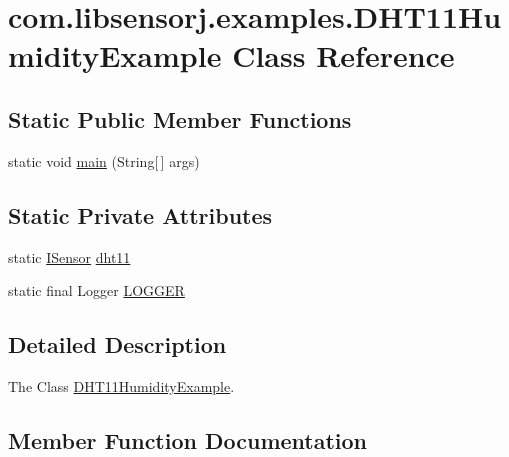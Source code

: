 \hypertarget{classcom_1_1libsensorj_1_1examples_1_1DHT11HumidityExample}{}\section{com.\+libsensorj.\+examples.\+D\+H\+T11\+Humidity\+Example Class Reference}
\label{classcom_1_1libsensorj_1_1examples_1_1DHT11HumidityExample}
\subsection*{Static Public Member Functions}
\begin{DoxyCompactItemize}
\item 
static void \hyperlink{classcom_1_1libsensorj_1_1examples_1_1DHT11HumidityExample_ad906ca82a6b80ab356f098b5705b2626}{main} (String\mbox{[}$\,$\mbox{]} args)
\end{DoxyCompactItemize}
\subsection*{Static Private Attributes}
\begin{DoxyCompactItemize}
\item 
static \hyperlink{interfacecom_1_1libsensorj_1_1interfaces_1_1ISensor}{I\+Sensor} \hyperlink{classcom_1_1libsensorj_1_1examples_1_1DHT11HumidityExample_a4e50eabfe642f347fcf1b39198da5739}{dht11}
\item 
static final Logger \hyperlink{classcom_1_1libsensorj_1_1examples_1_1DHT11HumidityExample_aee9ba7d87ffaf4d9571628bf3017ed61}{L\+O\+G\+G\+E\+R}
\end{DoxyCompactItemize}


\subsection{Detailed Description}
The Class \hyperlink{classcom_1_1libsensorj_1_1examples_1_1DHT11HumidityExample}{D\+H\+T11\+Humidity\+Example}. 

\subsection{Member Function Documentation}
\hypertarget{classcom_1_1libsensorj_1_1examples_1_1DHT11HumidityExample_ad906ca82a6b80ab356f098b5705b2626}{}
